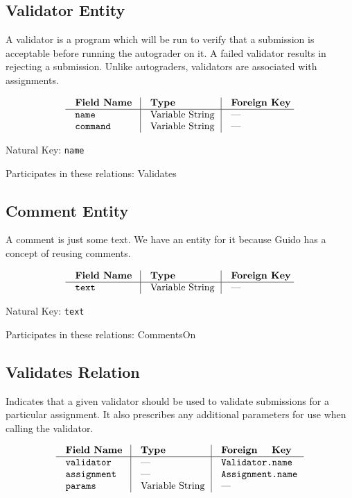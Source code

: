 \subsection{Validator Entity}
A validator is a program which will be run to verify that a submission 
is acceptable before running the autograder on it.
A failed validator results in rejecting a submission.
Unlike autograders, validators are associated with assignments.

$$\vbox{
  \offinterlineskip
  \halign{
    \strut \quad {\tt #}  & \vrule\quad #  & \vrule\quad # \cr
    {\bf Field Name}  & {\bf Type}  & {\bf Foreign Key}\cr
    \noalign{\hrule}    
    name  & Variable String  & --- \cr
    command  & Variable String  & --- \cr
  }
}$$

{\noindent
Natural Key: {\tt name}\par\noindent
Participates in these relations: Validates \par}

\subsection{Comment Entity}
A comment is just some text.
We have an entity for it because Guido has a concept of reusing comments.

$$\vbox{
  \offinterlineskip
  \halign{
    \strut \quad {\tt #}  & \vrule\quad #  & \vrule\quad # \cr
    {\bf Field Name}  & {\bf Type}  & {\bf Foreign Key}\cr
    \noalign{\hrule}    
    text  & Variable String  & --- \cr
  }
}$$

{\noindent
Natural Key: {\tt text}\par\noindent
Participates in these relations: CommentsOn \par}

\subsection{Validates Relation}
Indicates that a given validator should be used to validate 
submissions for a particular assignment. It also prescribes any 
additional parameters for use when calling the validator.

$$\vbox{
  \offinterlineskip
  \halign{
    \strut \quad {\tt #}  & \vrule\quad #  & \vrule\quad # \cr
    {\bf Field Name}  & {\bf Type}  & {\bf Foreign Key}\cr
    \noalign{\hrule}    
    validator  & ---  & {\tt Validator.name} \cr
    assignment  & ---  & {\tt Assignment.name} \cr
    params  & Variable String  & --- \cr
  }
}$$

